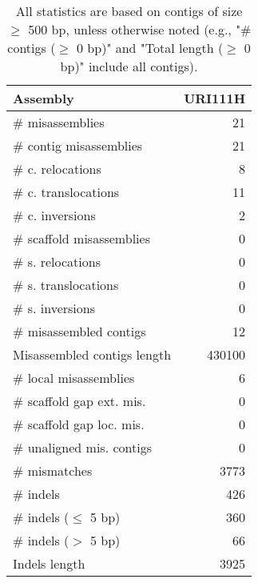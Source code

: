 \documentclass[12pt,a4paper]{article}
\begin{document}
\begin{table}[ht]
\begin{center}
\caption{All statistics are based on contigs of size $\geq$ 500 bp, unless otherwise noted (e.g., "\# contigs ($\geq$ 0 bp)" and "Total length ($\geq$ 0 bp)" include all contigs).}
\begin{tabular}{|l*{1}{|r}|}
\hline
Assembly & URI111H \\ \hline
\# misassemblies & 21 \\ \hline
\hspace{2mm}\# contig misassemblies & 21 \\ \hline
\hspace{5mm}\# c. relocations & 8 \\ \hline
\hspace{5mm}\# c. translocations & 11 \\ \hline
\hspace{5mm}\# c. inversions & 2 \\ \hline
\hspace{2mm}\# scaffold misassemblies & 0 \\ \hline
\hspace{5mm}\# s. relocations & 0 \\ \hline
\hspace{5mm}\# s. translocations & 0 \\ \hline
\hspace{5mm}\# s. inversions & 0 \\ \hline
\# misassembled contigs & 12 \\ \hline
Misassembled contigs length & 430100 \\ \hline
\# local misassemblies & 6 \\ \hline
\# scaffold gap ext. mis. & 0 \\ \hline
\# scaffold gap loc. mis. & 0 \\ \hline
\# unaligned mis. contigs & 0 \\ \hline
\# mismatches & 3773 \\ \hline
\# indels & 426 \\ \hline
\hspace{5mm}\# indels ($\leq$ 5 bp) & 360 \\ \hline
\hspace{5mm}\# indels ($>$ 5 bp) & 66 \\ \hline
Indels length & 3925 \\ \hline
\end{tabular}
\end{center}
\end{table}
\end{document}
